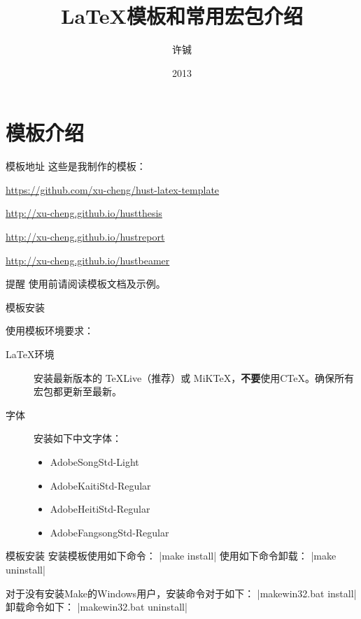 \documentclass[langauge=chinese]{hustbeamer}
\title{\LaTeX{}模板和常用宏包介绍}
\author{许铖}
\institute{\email{xucheng@hust.edu.cn}}
\date{2013}{11}{21}
\begin{document}
\maketitle
\PrintTOC

\section{模板介绍}

\begin{frame}[fragile]{\secname}{模板地址}
这些是我制作的模板：

\noindent\url{https://github.com/xu-cheng/hust-latex-template}

\begin{description}
\footnotesize
    \item[hustthesis] \url{http://xu-cheng.github.io/hustthesis}
    \item[hustreport] \url{http://xu-cheng.github.io/hustreport}
    \item[hustbeamer] \url{http://xu-cheng.github.io/hustbeamer}
\end{description}

\begin{block}{提醒}
使用前请阅读模板文档及示例。
\end{block}
\end{frame}

\begin{frame}[fragile]{\secname}{模板安装}

{\Large 使用模板环境要求：}
\begin{description}
    \item[\LaTeX{}环境] 安装最新版本的 TeXLive（推荐）或 MiKTeX，\newline\textbf{不要}使用CTeX。确保所有宏包都更新至最新。
    \item[字体] 安装如下中文字体：\\
    \begin{itemize}
        \item AdobeSongStd-Light
        \item AdobeKaitiStd-Regular
        \item AdobeHeitiStd-Regular
        \item AdobeFangsongStd-Regular
    \end{itemize}
\end{description}

\end{frame}

\begin{frame}[fragile]{\secname}{模板安装}
安装模板使用如下命令：
 |make install|
使用如下命令卸载：
 |make uninstall|

对于没有安装Make的Windows用户，安装命令对于如下：
 |makewin32.bat install|
卸载命令如下：
 |makewin32.bat uninstall|
\end{frame}
\end{document}
